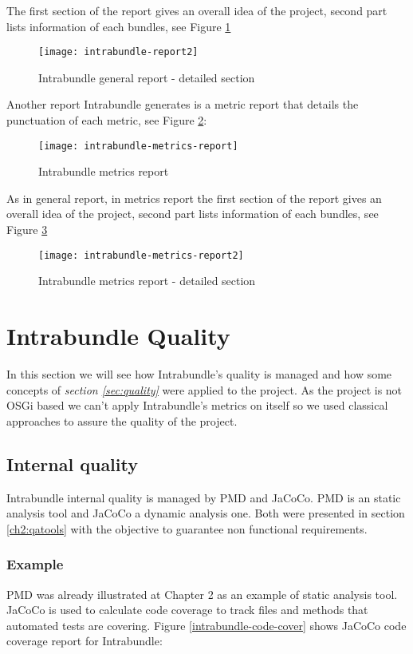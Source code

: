 The first section of the report gives an overall idea of the project, second part lists information of each bundles, see Figure \ref{intrabundle-report2} 

\begin{figure}[h]
\caption{Intrabundle general report - detailed section }
\label{intrabundle-report2}
\centering
\texttt{[image: intrabundle-report2]}
\end{figure}  
\FloatBarrier

Another report Intrabundle generates is a metric report that details the punctuation of each metric, see Figure \ref{intrabundle-metrics-report}:  

\begin{figure}[h]
\caption{Intrabundle metrics report}
\label{intrabundle-metrics-report}
\centering
\texttt{[image: intrabundle-metrics-report]}
\end{figure}  
\FloatBarrier

As in general report, in metrics report the first section of the report gives an overall idea of the project, second part lists information of each bundles, see Figure \ref{intrabundle-metrics-report2} 

\begin{figure}[h]
\caption{Intrabundle metrics report - detailed section}
\label{intrabundle-metrics-report2}
\centering
\texttt{[image: intrabundle-metrics-report2]}
\end{figure}  
\FloatBarrier

\section{Intrabundle Quality}
In this section we will see how Intrabundle's quality is managed and how some concepts of \textit{section \ref{sec:quality}} were applied to the project. As the project is not OSGi based we can't apply Intrabundle's metrics on itself so we used classical approaches to assure the quality of the project.

\subsection{Internal quality}
Intrabundle internal quality is managed by PMD and JaCoCo. PMD is an static analysis tool and JaCoCo a dynamic analysis one. Both were presented in section \ref{ch2:qatools} with the objective to guarantee non functional requirements.

\subsubsection{Example}
 PMD was already illustrated at Chapter 2 as an example of static analysis tool. JaCoCo is used to calculate code coverage to track files and methods that automated tests are covering. Figure \ref{intrabundle-code-cover} shows JaCoCo code coverage report for Intrabundle:

